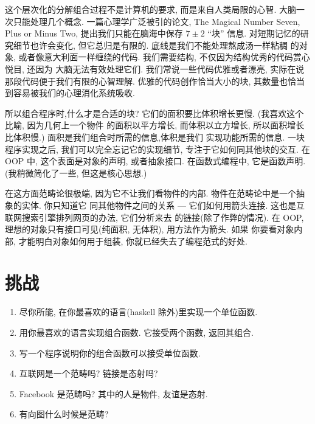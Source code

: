 这个层次化的分解组合过程不是计算机的要求, 而是来自人类局限的心智. 大脑一次只能处理几个概念.
一篇心理学广泛被引的论文, 
{The Magical Number Seven, Plus or Minus Two}, 提出我们只能在脑海中保存 $7 \pm 2$
``块'' 信息. 对短期记忆的研究细节也许会变化, 但它总归是有限的. 底线是我们不能处理熬成汤一样粘稠
的对象, 或者像意大利面一样缠绕的代码. 我们需要结构, 不仅因为结构优秀的代码赏心悦目, 还因为
大脑无法有效处理它们. 我们常说一些代码优雅或者漂亮, 实际在说那段代码便于我们有限的心智理解.
优雅的代码创作恰当大小的块, 其数量也恰当到容易被我们的心理消化系统吸收.

所以组合程序时,什么才是合适的块? 它们的面积要比体积增长更慢. (我喜欢这个比喻, 因为几何上一个物件
的面积以平方增长, 而体积以立方增长, 所以面积增长比体积慢.) 面积是我们组合时所需的信息,体积是我们
实现功能所需的信息. 一块程序实现之后, 我们可以完全忘记它的实现细节, 专注于它如何同其他块的交互.
在 OOP 中, 这个表面是对象的声明, 或者抽象接口. 在函数式编程中, 它是函数声明.(我稍微简化了一些, 但这是核心思想.)

在这方面范畴论很极端, 因为它不让我们看物件的内部. 物件在范畴论中是一个抽象的实体. 你只知道它
同其他物件之间的关系 --- 它们如何用箭头连接. 这也是互联网搜索引擎排列网页的办法, 它们分析来去
的链接(除了作弊的情况). 在 OOP, 理想的对象只有接口可见(纯面积, 无体积), 用方法作为箭头. 如果
你要看对象内部, 才能明白对象如何用于组装, 你就已经失去了编程范式的好处.

\section{挑战}

\begin{enumerate}
  \tightlist
  \item
        尽你所能, 在你最喜欢的语言(haskell 除外)里实现一个单位函数.
  \item
        用你最喜欢的语言实现组合函数. 它接受两个函数, 返回其组合.
  \item
        写一个程序说明你的组合函数可以接受单位函数.
  \item
        互联网是一个范畴吗? 链接是态射吗?
  \item
        Facebook 是范畴吗? 其中的人是物件, 友谊是态射.
  \item
        有向图什么时候是范畴?
\end{enumerate}
